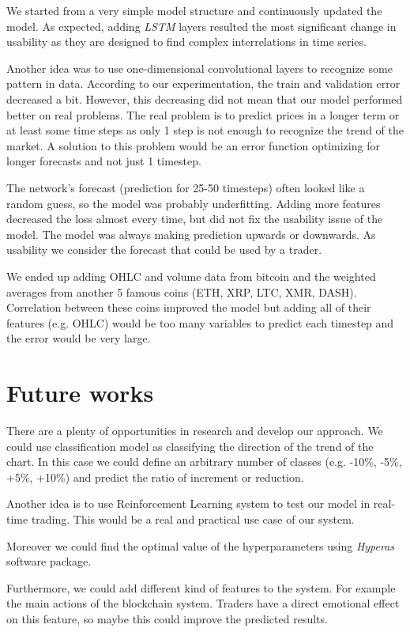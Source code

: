 \documentclass[conference]{IEEEtran}
\begin{document}
We started from a very simple model structure and continuously updated the model. As expected, adding \emph{LSTM} layers resulted the most significant change in usability as they are designed to find complex interrelations in time series.

Another idea was to use one-dimensional convolutional layers to recognize some pattern in data. According to our experimentation, the train and validation error decreased a bit. However, this decreasing did not mean that our model performed better on real problems. The real problem is to predict prices in a longer term or at least some time steps as only 1 step is not enough to recognize the trend of the market. A solution to this problem would be an error function optimizing for longer forecasts and not just 1 timestep.

The network's forecast (prediction for 25-50 timesteps) often looked like a random guess, so the model was probably underfitting. Adding more features decreased the loss almost every time, but did not fix the usability issue of the model. The model was always making prediction upwards or downwards. As usability we consider the forecast that could be used by a trader.

We ended up adding OHLC and volume data from bitcoin and the weighted averages from another 5 famous coins (ETH, XRP, LTC, XMR, DASH). Correlation between these coins improved the model but adding all of their features (e.g. OHLC) would be too many variables to predict each timestep and the error would be very large.

\section{Future works}

There are a plenty of opportunities in research and develop our approach. We could use classification model as classifying the direction of the trend of the chart. In this case we could define an arbitrary number of classes (e.g. -10\%, -5\%, +5\%, +10\%) and predict the ratio of increment or reduction.

Another idea is to use Reinforcement Learning system to test our model in real-time trading. This would be a real and practical use case of our system.

Moreover we could find the optimal value of the hyperparameters using \emph{Hyperas} software package.

Furthermore, we could add different kind of features to the system. For example the main actions of the blockchain system. Traders have a direct emotional effect on this feature, so maybe this could improve the predicted results.
\end{document}
